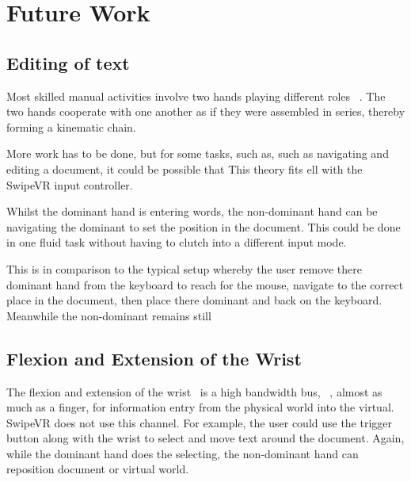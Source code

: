 \section{Future Work}
\subsection{Editing of text}
Most skilled manual activities involve two hands playing different roles ~\cite{guiard1987asymmetric, Casalta:1999:ETI:632716.632862}.
The two hands cooperate with one another as if they were assembled in series, thereby forming a kinematic chain.

More work has to be done, but for some tasks, such as, such as navigating and editing a document, it could be possible that This theory fits ell with the SwipeVR input controller.

Whilst the dominant hand is entering words, the non-dominant hand can be navigating the dominant to set the position in the document.
This could be done in one fluid task without having to clutch into a different input mode.

This is in  comparison to the typical setup whereby the user remove there dominant hand from the keyboard to reach for the mouse, navigate to the correct place in the document, then place there dominant and back on the keyboard. 
Meanwhile the non-dominant remains still

\subsection{Flexion and Extension of the Wrist}
The flexion and extension of the wrist~\cite{sarrafian1977study} is a high bandwidth bus, ~\cite{TBD}, almost as much as a finger, for information entry from the physical world into the virtual.
SwipeVR does not use this channel.
For example, the user could use the trigger button along with the wrist to select and move text around the document.
Again, while the dominant hand does the selecting, the non-dominant hand can reposition document or virtual world.

